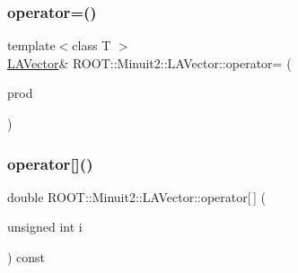 \subsubsection{\texorpdfstring{operator=()}{operator=()}\hspace{0.1cm}{\footnotesize\ttfamily [21/21]}}
{\footnotesize\ttfamily template$<$class T $>$ \\
\mbox{\hyperlink{classROOT_1_1Minuit2_1_1LAVector}{L\+A\+Vector}}\& R\+O\+O\+T\+::\+Minuit2\+::\+L\+A\+Vector\+::operator= (\begin{DoxyParamCaption}\item[{const \mbox{\hyperlink{classROOT_1_1Minuit2_1_1ABObj}{A\+B\+Obj}}$<$ \mbox{\hyperlink{classROOT_1_1Minuit2_1_1vec}{vec}}, \mbox{\hyperlink{classROOT_1_1Minuit2_1_1ABSum}{A\+B\+Sum}}$<$ \mbox{\hyperlink{classROOT_1_1Minuit2_1_1ABObj}{A\+B\+Obj}}$<$ \mbox{\hyperlink{classROOT_1_1Minuit2_1_1vec}{vec}}, \mbox{\hyperlink{classROOT_1_1Minuit2_1_1ABProd}{A\+B\+Prod}}$<$ \mbox{\hyperlink{classROOT_1_1Minuit2_1_1ABObj}{A\+B\+Obj}}$<$ \mbox{\hyperlink{classROOT_1_1Minuit2_1_1sym}{sym}}, \mbox{\hyperlink{classROOT_1_1Minuit2_1_1LASymMatrix}{L\+A\+Sym\+Matrix}}, T $>$, \mbox{\hyperlink{classROOT_1_1Minuit2_1_1ABObj}{A\+B\+Obj}}$<$ \mbox{\hyperlink{classROOT_1_1Minuit2_1_1vec}{vec}}, \mbox{\hyperlink{classROOT_1_1Minuit2_1_1LAVector}{L\+A\+Vector}}, T $>$ $>$, T $>$, \mbox{\hyperlink{classROOT_1_1Minuit2_1_1ABObj}{A\+B\+Obj}}$<$ \mbox{\hyperlink{classROOT_1_1Minuit2_1_1vec}{vec}}, \mbox{\hyperlink{classROOT_1_1Minuit2_1_1LAVector}{L\+A\+Vector}}, T $>$ $>$, T $>$ \&}]{prod }\end{DoxyParamCaption})\hspace{0.3cm}{\ttfamily [inline]}}

\mbox{\label{classROOT_1_1Minuit2_1_1LAVector_a2ce4a54737c9a2b3097adb48bbe2913c}} 
\subsubsection{\texorpdfstring{operator[]()}{operator[]()}\hspace{0.1cm}{\footnotesize\ttfamily [1/6]}}
{\footnotesize\ttfamily double R\+O\+O\+T\+::\+Minuit2\+::\+L\+A\+Vector\+::operator\mbox{[}$\,$\mbox{]} (\begin{DoxyParamCaption}\item[{unsigned int}]{i }\end{DoxyParamCaption}) const\hspace{0.3cm}{\ttfamily [inline]}}


